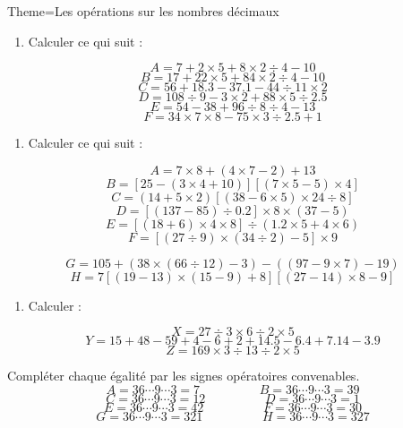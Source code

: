 \documentclass[a4paper,12pt]{article}
\begin{document}
\begin{Maquette}[Fiche]{Theme=Les opérations sur les nombres décimaux}

\begin{exercice}
\begin{enumerate}
\item Calculer ce qui suit :
\end{enumerate}
\begin{multicols}{2}
$$A=7+2\times 5+8\times 2\div 4-10$$
$$B=17+22\times 5+84\times 2\div 4-10$$
$$C=56+18.3-37.1-44\div 11\times 2$$
$$D=108\div 9-3\times 2+88 \times 5\div 2.5$$
$$E=54-38+96\div 8\div 4-13$$
$$F=34\times 7 \times 8- 75\times 3\div 2.5 +1$$
\end{multicols}

\end{exercice}

\begin{exercice}
\begin{enumerate}
\item Calculer ce qui suit :
\end{enumerate}
\begin{multicols}{2}
$$A=7\times 8+\left(4\times 7-2\right)+13$$
$$B=\left[25-\left(3\times 4+10\right)\right]\left[\left(7\times 5-5\right)\times 4\right]$$
$$C=\left(14+5\times 2\right)\left[\left(38-6\times 5\right)\times 24\div 8\right]$$
$$D=\left[\left(137-85\right)\div 0.2\right]\times 8\times \left(37-5\right)$$
$$E=\left[\left(18+6\right)\times 4\times 8\right]\div \left(1.2\times 5+4\times 6\right)$$
$$F=\left[\left(27\div 9\right)\times \left(34\div 2\right)-5\right]\times 9$$
\end{multicols}
$$G=105+\left(38\times \left(66\div 12\right)-3\right)-\left(\left(97-9\times 7\right)-19\right)$$
$$H=7\left[\left(19-13\right)\times \left(15-9\right)+8\right]\left[\left(27-14\right)\times 8-9\right]$$

\end{exercice}

\begin{exercice}
\begin{enumerate}
\item Calculer :
\end{enumerate}
$$X=27\div 3\times 6\div 2\times 5$$
$$Y=15+48-59+4-6+2+14.5-6.4+7.14-3.9$$
$$Z=169\times 3\div 13\div 2\times 5$$
\end{exercice}

\begin{exercice}
Compléter chaque égalité par les signes opératoires convenables.
$$A=36\cdots 9\cdots 3=7\hspace{2cm}B=36\cdots 9\cdots 3=39 $$
$$C=36\cdots 9\cdots 3=12\hspace{2cm}D=36\cdots 9\cdots 3=1 $$
$$E=36\cdots 9\cdots 3=42\hspace{2cm}F=36\cdots 9\cdots 3=30 $$
$$G=36\cdots 9\cdots 3=321\hspace{2cm}H=36\cdots 9\cdots 3=327$$
\end{exercice}


\end{Maquette}
\end{document}
